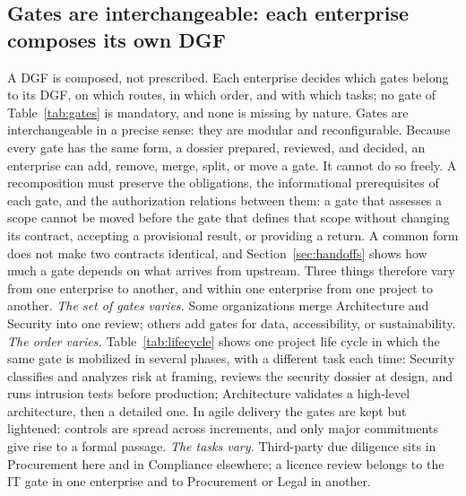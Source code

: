\subsection{Gates are interchangeable: each enterprise composes its own DGF}
\label{sec:notfixed}

A DGF is composed, not prescribed. Each enterprise decides which gates belong to its DGF, on which routes,
in which order, and with which tasks; no gate of Table~\ref{tab:gates} is mandatory, and none is missing
by nature. Gates are interchangeable in a precise sense: they are modular and reconfigurable.
Because every gate has the same form, a dossier prepared, reviewed, and decided, an enterprise can add,
remove, merge, split, or move a gate. It cannot do so freely. A recomposition must preserve the
obligations, the informational prerequisites of each gate, and the authorization relations between
them: a gate that assesses a scope cannot be moved before the gate that defines that scope without
changing its contract, accepting a provisional result, or providing a return. A common form does not
make two contracts identical, and Section~\ref{sec:handoffs} shows how much a gate depends on what
arrives from upstream. Three things therefore vary from one enterprise to
another, and within one enterprise from one project to another.
\emph{The set of gates varies.} Some organizations merge Architecture and Security into one review;
others add gates for data, accessibility, or sustainability. \emph{The order varies.}
Table~\ref{tab:lifecycle} shows one project life cycle in which the same gate is mobilized in several
phases, with a different task each time: Security classifies and analyzes risk at framing, reviews the
security dossier at design, and runs intrusion tests before production; Architecture validates a
high-level architecture, then a detailed one. In agile delivery the gates are kept but lightened: controls
are spread across increments, and only major commitments give rise to a formal passage. \emph{The tasks
vary.} Third-party due diligence sits in Procurement here and in Compliance elsewhere; a licence review
belongs to the IT gate in one enterprise and to Procurement or Legal in another.

